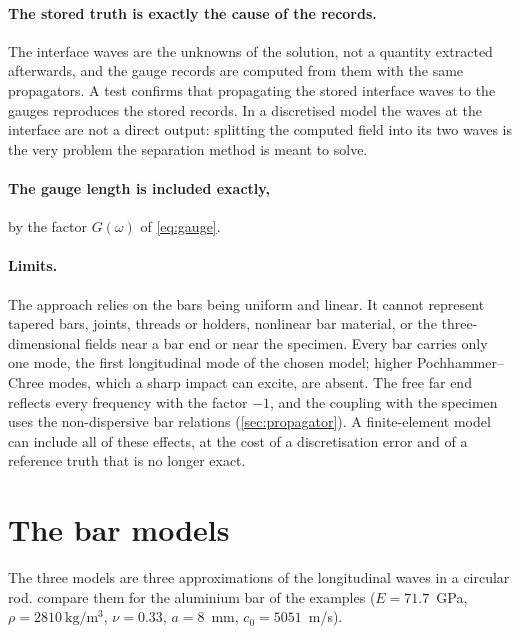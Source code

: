 \documentclass[11pt,a4paper,numbers=noenddot,abstract=true]{scrartcl}
\begin{document}
\paragraph{The stored truth is exactly the cause of the records.} The interface waves are the unknowns of the
solution, not a quantity extracted afterwards, and the gauge records are computed from them with the same
propagators. A test confirms that propagating the stored interface waves to the gauges reproduces the stored
records. In a discretised model the waves at the interface are not a direct output: splitting the computed field
into its two waves is the very problem the separation method is meant to solve.

\paragraph{The gauge length is included exactly,} by the factor $G(\omega)$ of \cref{eq:gauge}.

\paragraph{Limits.} The approach relies on the bars being uniform and linear. It cannot represent tapered bars,
joints, threads or holders, nonlinear bar material, or the three-dimensional fields near a bar end or near the
specimen. Every bar carries only one mode, the first longitudinal mode of the chosen model; higher
Pochhammer--Chree modes, which a sharp impact can excite, are absent. The free far end reflects every frequency
with the factor $-1$, and the coupling with the specimen uses the non-dispersive bar relations
(\cref{sec:propagator}). A finite-element model can include all of these effects, at the cost of a discretisation
error and of a reference truth that is no longer exact.

\section{The bar models}
\label{sec:models}

The three models are three approximations of the longitudinal waves in a circular rod.
 compare them for the aluminium bar of the examples ($E = 71.7$~GPa,
$\rho = 2810~\mathrm{kg/m^3}$, $\nu = 0.33$, $a = 8$~mm, $c_0 = 5051$~m/s).
\end{document}
